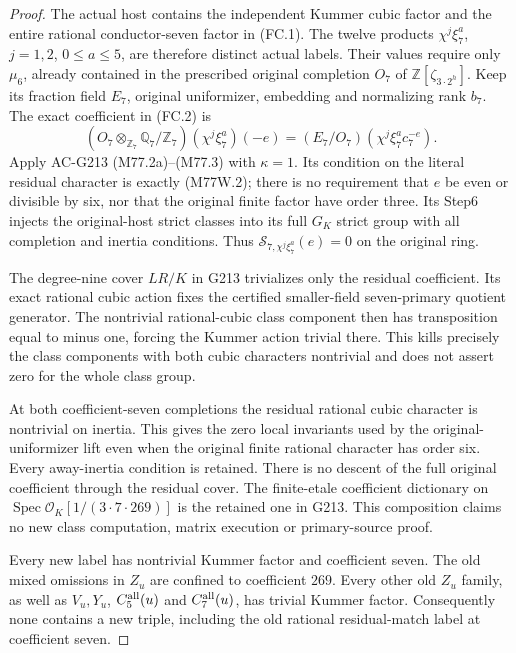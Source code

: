 \begin{proof}
The actual host contains the independent Kummer cubic factor
and the entire rational conductor-seven factor in (FC.1).
The twelve products $\chi^j\xi_7^a$, $j=1,2$, $0\leq a\leq5$,
are therefore distinct actual labels. Their values require only
$\mu_6$, already contained in the prescribed original completion
$O_7$ of $\mathbb Z[\zeta_{3\cdot2^h}]$.
Keep its fraction field $E_7$, original uniformizer, embedding
and normalizing rank $b_7$.
The exact coefficient in (FC.2) is
\[
 (O_7\otimes_{\mathbb Z_7}\mathbb Q_7/\mathbb Z_7)
                                  (\chi^j\xi_7^a)(-e)
       =(E_7/O_7)(\chi^j\xi_7^a c_7^{-e}).
 \tag{M77W.8}
\]
Apply AC-G213 (M77.2a)--(M77.3) with $\kappa=1$.
Its condition on the literal residual character is exactly
(M77W.2); there is no requirement that $e$ be even or divisible
by six, nor that the original finite factor have order three.
Its Step6 injects the original-host strict classes into its
full $G_K$ strict group with all completion and inertia conditions.
Thus $\mathcal S_{7,\chi^j\xi_7^a}(e)=0$ on the original ring.

The degree-nine cover $LR/K$ in G213 trivializes only the residual
coefficient. Its exact rational cubic action fixes the certified
smaller-field seven-primary quotient generator. The nontrivial
rational-cubic class component then has transposition equal to
minus one, forcing the Kummer action trivial there. This kills precisely the class components with both cubic
characters nontrivial and does not assert zero for the whole class group.

At both coefficient-seven completions the residual rational
cubic character is nontrivial on inertia. This gives the zero
local invariants used by the original-uniformizer lift even when
the original finite rational character has order six.
Every away-inertia condition is retained. There is no descent
of the full original coefficient through the residual cover.
The finite-etale coefficient dictionary on
$\operatorname{Spec}\mathcal O_K[1/(3\cdot7\cdot269)]$
is the retained one in G213. This composition claims no new
class computation, matrix execution or primary-source proof.

Every new label has nontrivial Kummer factor and coefficient seven.
The old mixed omissions in $Z_u$ are confined to coefficient
$269$. Every other old $Z_u$ family, as well as $V_u,Y_u$,
$C_5^{\rm all}(u)$ and $C_7^{\rm all}(u)$, has trivial Kummer
factor. Consequently none contains a new triple, including
the old rational residual-match label at coefficient seven.


\end{proof}
